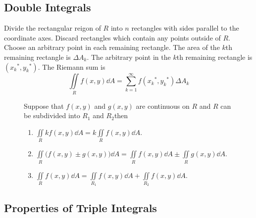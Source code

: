 \documentclass{article}
\begin{document}
\subsection{Double Integrals}
\begin{theorem}
    Divide the rectangular reigon of $R$ into $n$ rectangles with sides parallel to the coordinate axes.
    Discard rectangles which contain any points outside of $R$.
    Choose an arbitrary point in each remaining rectangle.
    The area of the $k$th remaining rectangle is $\Delta A_k$.
    The arbitrary point in the $k$th remaining rectangle is $({x_k}^\ast, {y_k}^\ast)$.
    The Riemann sum is
    \begin{equation*}
        \iint\limits_{R} f(x, y)  \dd{A} = \sum_{k=1}^{\infty} f({x_k}^\ast, {y_k}^\ast) \Delta{}A_k
    \end{equation*}
\end{theorem}
\begin{figure}[H]
	\begin{mdframed}[style=exampledefault,frametitle={Properties of Double Integrals}]
		\begin{theorem}
            Suppose that $f(x, y) $ and $g(x, y)$ are continuous on $R$
            and $R$ can be subdivided into $R_1$ and $R_2$then
			\begin{enumerate}[label=\normalfont\alph*)]
				\item $\displaystyle\iint\limits_R kf(x, y) \dd{A} = k\iint\limits_R f(x, y) \dd{A}$.
				\item $\displaystyle\iint\limits_R \bigl(f(x, y) \pm g(x, y)\bigr) \dd{A} = \iint\limits_R f(x, y) \dd{A} \pm \iint\limits_R g(x, y) \dd{A}$.
                \item $\displaystyle\iint\limits_R f(x, y) \dd{A} = \iint\limits_{R_1} f(x, y) \dd{A} + \iint\limits_{R_2} f(x, y) \dd{A}$.
			\end{enumerate}
		\end{theorem}
	\end{mdframed}
\end{figure}
\subsection{Properties of Triple Integrals}
\end{document}
